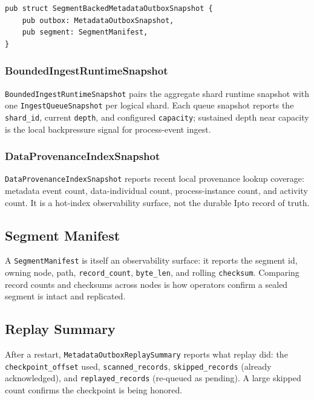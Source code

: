 \begin{lstlisting}
pub struct SegmentBackedMetadataOutboxSnapshot {
    pub outbox: MetadataOutboxSnapshot,
    pub segment: SegmentManifest,
}
\end{lstlisting}

\subsubsection{BoundedIngestRuntimeSnapshot}

\texttt{BoundedIngestRuntimeSnapshot} pairs the aggregate shard runtime snapshot
with one \texttt{IngestQueueSnapshot} per logical shard. Each queue snapshot
reports the \texttt{shard\_id}, current \texttt{depth}, and configured
\texttt{capacity}; sustained depth near capacity is the local backpressure signal
for process-event ingest.

\subsubsection{DataProvenanceIndexSnapshot}

\texttt{DataProvenanceIndexSnapshot} reports recent local provenance lookup
coverage: metadata event count, data-individual count, process-instance count,
and activity count. It is a hot-index observability surface, not the durable
Ipto record of truth.

\subsection{Segment Manifest}

A \texttt{SegmentManifest} is itself an observability surface: it reports the
segment id, owning node, path, \texttt{record\_count}, \texttt{byte\_len}, and
rolling \texttt{checksum}. Comparing record counts and checksums across nodes is
how operators confirm a sealed segment is intact and replicated.

\subsection{Replay Summary}

After a restart, \texttt{MetadataOutboxReplaySummary} reports what replay did:
the \texttt{checkpoint\_offset} used, \texttt{scanned\_records},
\texttt{skipped\_records} (already acknowledged), and \texttt{replayed\_records}
(re-queued as pending). A large skipped count confirms the checkpoint is being
honored.

